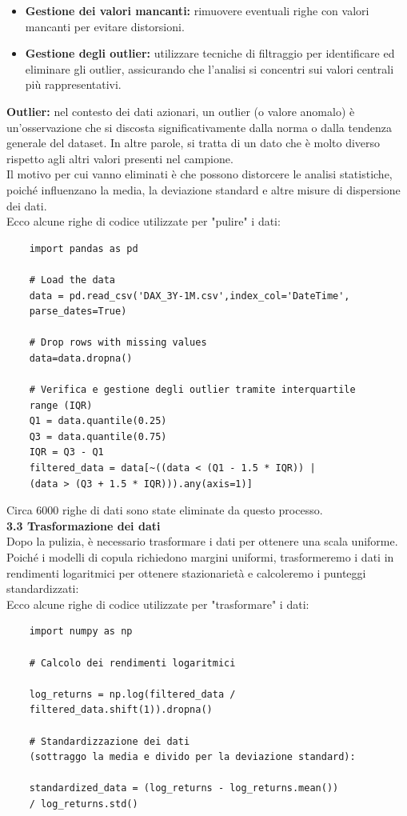\documentclass[a4paper,12pt]{article}
\begin{document}
\begin{itemize}
	\item \textbf{Gestione dei valori mancanti:} rimuovere eventuali righe con valori mancanti per evitare distorsioni.
	\item \textbf{Gestione degli outlier:} utilizzare tecniche di filtraggio per identificare ed eliminare gli outlier, assicurando che l'analisi si concentri sui valori centrali più rappresentativi.
\end{itemize}
\textbf{Outlier:} 
nel contesto dei dati azionari, un outlier (o valore anomalo) è un'osservazione che si discosta significativamente dalla norma o dalla tendenza generale del dataset. In altre parole, si tratta di un dato che è molto diverso rispetto agli altri valori presenti nel campione.\\

\noindent Il motivo per cui vanno eliminati è che possono distorcere le analisi statistiche, poiché influenzano la media, la deviazione standard e altre misure di dispersione dei dati.\\

\noindent Ecco alcune righe di codice utilizzate per "pulire" i dati:
\begin{verbatim}
	import pandas as pd
	
	# Load the data
	data = pd.read_csv('DAX_3Y-1M.csv',index_col='DateTime',
	parse_dates=True)
	
	# Drop rows with missing values
	data=data.dropna()
	
	# Verifica e gestione degli outlier tramite interquartile
	range (IQR)
	Q1 = data.quantile(0.25)
	Q3 = data.quantile(0.75)
	IQR = Q3 - Q1
	filtered_data = data[~((data < (Q1 - 1.5 * IQR)) | 
	(data > (Q3 + 1.5 * IQR))).any(axis=1)]
\end{verbatim}
Circa 6000 righe di dati sono state eliminate da questo processo.\\

\noindent\textbf{3.3 Trasformazione dei dati} \\

\noindent Dopo la pulizia, è necessario trasformare i dati per ottenere una scala uniforme. Poiché i modelli di copula richiedono margini uniformi, trasformeremo i dati in rendimenti logaritmici per ottenere stazionarietà e calcoleremo i punteggi standardizzati:\\

\noindent Ecco alcune righe di codice utilizzate per "trasformare" i dati:
\begin{verbatim}
	import numpy as np
	
	# Calcolo dei rendimenti logaritmici
	
	log_returns = np.log(filtered_data / 
	filtered_data.shift(1)).dropna()
	
	# Standardizzazione dei dati
	(sottraggo la media e divido per la deviazione standard):
	
	standardized_data = (log_returns - log_returns.mean())
	/ log_returns.std()
\end{verbatim}
\end{document}
